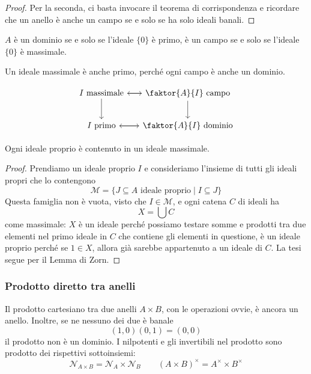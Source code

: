 \begin{multicols}{2}
\begin{proof}
	Per la seconda, ci basta invocare il teorema di corrispondenza e ricordare che un anello è anche un campo se e solo se ha solo ideali banali.
\end{proof}

\begin{remark}
	$ A $ è un dominio se e solo se l'ideale $ \{0\} $ è primo, è un campo se e solo se l'ideale $ \{0\} $ è massimale.
\end{remark}
\begin{remark}
	Un ideale massimale è anche primo, perché ogni campo è anche un dominio.
\end{remark}

\[ \begin{tikzcd}[row sep=0.75cm, column sep=0.5 cm]
I \text{ massimale} \arrow{r} \arrow[swap]{d} &  \faktor{A}{I} \text{ campo} \arrow{l} \arrow[swap]{d} \\
I \text{ primo} \arrow{r}  &  \faktor{A}{I} \text{ dominio} \arrow{l}
\end{tikzcd} \]

\begin{prop}\label{idmax}
	Ogni ideale proprio è contenuto in un ideale massimale.
\end{prop}
\begin{proof}
	Prendiamo un ideale proprio $ I $ e consideriamo l'insieme di tutti gli ideali propri che lo contengono
	\[ \mathcal{M} = \{ J \subseteq A \text{ ideale proprio} \mid I \subseteq J \} \]
	Questa famiglia non è vuota, visto che $ I \in \mathcal{M} $, e ogni catena $ C $ di ideali ha 
	\[ X = \bigcup C \]
	come massimale: $ X $ è un ideale perché possiamo testare somme e prodotti tra due elementi nel primo ideale in $ C $ che contiene gli elementi in questione, è un ideale proprio perché se $ 1 \in  X $, allora già sarebbe appartenuto a un ideale di $ C $. La tesi segue per il Lemma di Zorn.
\end{proof}
	

\subsubsection{Prodotto diretto tra anelli} Il prodotto cartesiano tra due anelli $ A \times B $, con le operazioni ovvie, è ancora un anello. Inoltre, se ne nessuno dei due è banale \[ (1, 0)(0, 1) = (0, 0) \] il prodotto non è un dominio. I nilpotenti e gli invertibili nel prodotto sono prodotto dei rispettivi sottoinsiemi:
\[ \mathcal{N}_{A \times B} = \mathcal{N}_A \times \mathcal{N}_B \qquad (A\times B)^\times = A^\times \times B^\times \]


\end{multicols}

